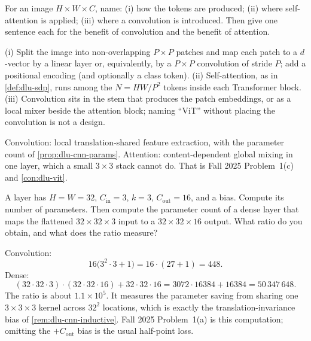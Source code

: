 \begin{exercise}
\label{ex:dlu-vit}
For an image \(H\times W\times C\), name: (i) how the tokens are produced; (ii) where self-attention is applied; (iii) where a convolution is introduced. Then give one sentence each for the benefit of convolution and the benefit of attention.
\end{exercise}

\begin{solution}
(i) Split the image into non-overlapping \(P\times P\) patches and map each patch to a \(d\)-vector by a linear layer or, equivalently, by a \(P\times P\) convolution of stride \(P\); add a positional encoding (and optionally a class token). (ii) Self-attention, as in \cref{def:dlu-sdp}, runs among the \(N=HW/P^{2}\) tokens inside each Transformer block. (iii) Convolution sits in the stem that produces the patch embeddings, or as a local mixer beside the attention block; naming ``ViT'' without placing the convolution is not a design.

Convolution: local translation-shared feature extraction, with the parameter count of \cref{prop:dlu-cnn-params}. Attention: content-dependent global mixing in one layer, which a small \(3\times 3\) stack cannot do. That is Fall 2025 Problem~1(c) and \cref{con:dlu-vit}.
\end{solution}

\begin{exercise}
\label{ex:dlu-cnn-count}
A layer has \(H=W=32\), \(C_{\mathrm{in}}=3\), \(k=3\), \(C_{\mathrm{out}}=16\), and a bias. Compute its number of parameters. Then compute the parameter count of a dense layer that maps the flattened \(32\times 32\times 3\) input to a \(32\times 32\times 16\) output. What ratio do you obtain, and what does the ratio measure?
\end{exercise}

\begin{solution}
Convolution:
\[
16\bigl(3^{2}\cdot 3+1\bigr)
=
16\cdot(27+1)
=
448.
\]
Dense:
\[
(32\cdot 32\cdot 3)\cdot(32\cdot 32\cdot 16)+32\cdot 32\cdot 16
=
3072\cdot 16384+16384
=
50\,347\,648.
\]
The ratio is about \(1.1\times 10^{5}\). It measures the parameter saving from sharing one \(3\times 3\times 3\) kernel across \(32^{2}\) locations, which is exactly the translation-invariance bias of \cref{rem:dlu-cnn-inductive}. Fall 2025 Problem~1(a) is this computation; omitting the \(+C_{\mathrm{out}}\) bias is the usual half-point loss.
\end{solution}

